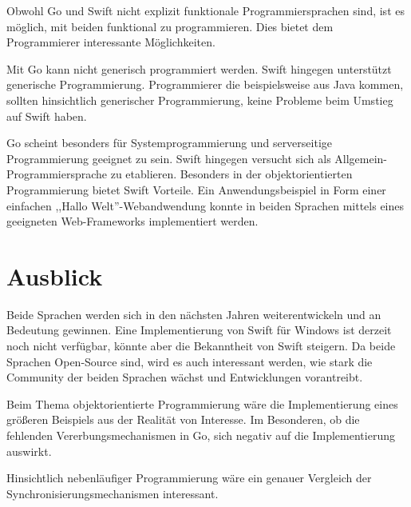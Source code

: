 Obwohl Go und Swift nicht explizit funktionale Programmiersprachen sind, ist es möglich, mit beiden funktional zu programmieren.
Dies bietet dem Programmierer interessante Möglichkeiten.

Mit Go kann nicht generisch programmiert werden.
Swift hingegen unterstützt generische Programmierung. 
Programmierer die beispielsweise aus Java kommen, sollten hinsichtlich generischer Programmierung, keine Probleme beim Umstieg auf Swift haben.

Go scheint besonders für Systemprogrammierung und serverseitige Programmierung geeignet zu sein.
Swift hingegen versucht sich als Allgemein-Programmiersprache zu etablieren.
Besonders in der objektorientierten Programmierung bietet Swift Vorteile.
Ein Anwendungsbeispiel in Form einer einfachen ,,Hallo Welt''-Webandwendung konnte in beiden Sprachen mittels eines geeigneten Web-Frameworks implementiert werden.

\chapter{Ausblick}
Beide Sprachen werden sich in den nächsten Jahren weiterentwickeln und an Bedeutung gewinnen. 
Eine Implementierung von Swift für Windows ist derzeit noch nicht verfügbar, könnte aber die Bekanntheit von Swift steigern.
Da beide Sprachen Open-Source sind, wird es auch interessant werden, wie stark die Community der beiden Sprachen wächst und Entwicklungen vorantreibt.

Beim Thema objektorientierte Programmierung wäre die Implementierung eines größeren Beispiels aus der Realität von Interesse.
Im Besonderen, ob die fehlenden Vererbungsmechanismen in Go, sich negativ auf die Implementierung auswirkt.

Hinsichtlich nebenläufiger Programmierung wäre ein genauer Vergleich der Synchronisierungsmechanismen interessant.